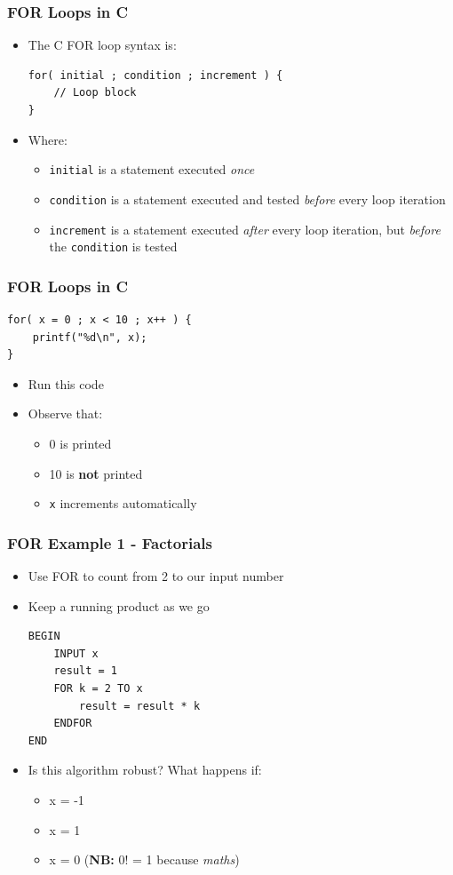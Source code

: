 \documentclass[14pt]{beamer}
\begin{document}
\begin{frame}[fragile]
\frametitle{FOR Loops in C}
\begin{itemize}
\item The C FOR loop syntax is:
\begin{lstlisting}[style=CStyle]
for( initial ; condition ; increment ) {
	// Loop block
}
\end{lstlisting}
\item Where:
	\begin{itemize}
		\item \texttt{initial} is a statement executed \textit{once}
		\item \texttt{condition} is a statement executed and tested \textit{before} every loop iteration
		\item \texttt{increment} is a statement executed \textit{after} every loop iteration, but \textit{before} the \texttt{condition} is tested
	\end{itemize}
\end{itemize}
\end{frame}

\begin{frame}[fragile]
\frametitle{FOR Loops in C}
\begin{lstlisting}[style=CStyle]
for( x = 0 ; x < 10 ; x++ ) {
	printf("%d\n", x);
}
\end{lstlisting}
\begin{itemize}
\item Run this code
\item Observe that:
	\begin{itemize}
		\item 0 is printed
		\item 10 is \textbf{not} printed
		\item \texttt{x} increments automatically
	\end{itemize}

\end{itemize}
\end{frame}


\begin{frame}[fragile]
\frametitle{FOR Example 1 - Factorials}
\begin{itemize}
\item Use FOR to count from 2 to our input number
\item Keep a running product as we go
\begin{lstlisting}[style=pseudo]
BEGIN
	INPUT x
	result = 1
	FOR k = 2 TO x
		result = result * k
	ENDFOR
END
\end{lstlisting}
\item Is this algorithm robust? What happens if:
	\begin{itemize}
		\item x = -1
		\item x = 1
		\item x = 0 (\textbf{NB:} 0! = 1 because \textit{maths})
	\end{itemize}
\end{itemize}
\end{frame}
\end{document}
